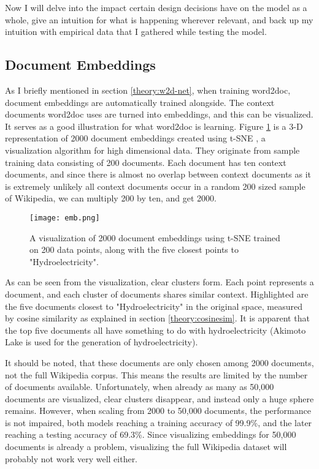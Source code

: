 Now I will delve into the impact certain design decisions have on the model as a whole, give an intuition for what is happening
wherever relevant, and back up my intuition with empirical data that I gathered while testing the model.

\subsection{Document Embeddings}
\label{exp:embb}

As I briefly mentioned in section \ref{theory:w2d-net}, when training word2doc, document embeddings are automatically trained
alongside. The context documents word2doc uses are turned into embeddings, and this can be visualized. It serves as a good illustration
for what word2doc is learning. Figure \ref{fig:tsne} is a 3-D representation of 2000 document embeddings created using t-SNE
\citep{tsne}, a visualization algorithm for high dimensional data. They originate from sample training data consisting of 200
documents. Each document has ten context documents, and since there is almost no overlap between context documents as it is extremely
unlikely all context documents occur in a random 200 sized sample of Wikipedia, we can multiply 200 by ten, and get 2000.

\begin{figure}
  \begin{center}
    \texttt{[image: emb.png]}
  \end{center}
  \captionsetup{width=.75\linewidth}
  \caption{A visualization of 2000 document embeddings using t-SNE \citep{tsne} trained on 200 data points, along with the five
  closest points to "Hydroelectricity".}
  \label{fig:tsne}
\end{figure}

As can be seen from the visualization, clear clusters form. Each point represents a document, and each cluster of documents
shares similar context. Highlighted are the five documents closest to "Hydroelectricity" in the original space, measured by cosine
similarity as explained in section \ref{theory:cosinesim}. It is apparent that the top five documents all have something to do with
hydroelectricity (Akimoto Lake is used for the generation of hydroelectricity).

It should be noted, that these documents are only chosen among 2000 documents, not the full Wikipedia corpus. This means the
results are limited by the number of documents available. Unfortunately, when already as many as 50,000 documents are visualized,
clear clusters disappear, and instead only a huge sphere remains. However, when scaling from 2000 to 50,000 documents,
the performance is not impaired, both models reaching a training accuracy of 99.9\%, and the later reaching a testing accuracy
of 69.3\%. Since visualizing embeddings for 50,000 documents is already a problem, visualizing the full Wikipedia dataset will probably
not work very well either.

